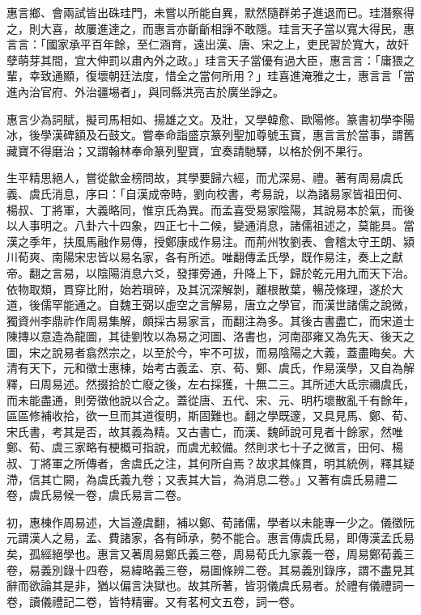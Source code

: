 \begin{pinyinscope}
惠言鄉、會兩試皆出硃珪門，未嘗以所能自異，默然隨群弟子進退而已。珪潛察得之，則大喜，故屢進達之，而惠言亦齗齗相諍不敢隱。珪言天子當以寬大得民，惠言言：「國家承平百年餘，至仁涵育，遠出漢、唐、宋之上，吏民習於寬大，故奸孽萌芽其間，宜大伸罰以肅內外之政。」珪言天子當優有過大臣，惠言言：「庸猥之輩，幸致通顯，復壞朝廷法度，惜全之當何所用？」珪喜進淹雅之士，惠言言「當進內治官府、外治疆埸者」，與同縣洪亮吉於廣坐諍之。

惠言少為詞賦，擬司馬相如、揚雄之文。及壯，又學韓愈、歐陽修。篆書初學李陽冰，後學漢碑額及石鼓文。嘗奉命詣盛京篆列聖加尊號玉寶，惠言言於當事，謂舊藏寶不得磨治；又謂翰林奉命篆列聖寶，宜奏請馳驛，以格於例不果行。

生平精思絕人，嘗從歙金榜問故，其學要歸六經，而尤深易、禮。著有周易虞氏義、虞氏消息，序曰：「自漢成帝時，劉向校書，考易說，以為諸易家皆祖田何、楊叔、丁將軍，大義略同，惟京氏為異。而孟喜受易家陰陽，其說易本於氣，而後以人事明之。八卦六十四象，四正七十二候，變通消息，諸儒祖述之，莫能具。當漢之季年，扶風馬融作易傳，授鄭康成作易注。而荊州牧劉表、會稽太守王朗、潁川荀爽、南陽宋忠皆以易名家，各有所述。唯翻傳孟氏學，既作易注，奏上之獻帝。翻之言易，以陰陽消息六爻，發揮旁通，升降上下，歸於乾元用九而天下治。依物取類，貫穿比附，始若瑣碎，及其沉深解剝，離根散葉，暢茂條理，遂於大道，後儒罕能通之。自魏王弼以虛空之言解易，唐立之學官，而漢世諸儒之說微，獨資州李鼎祚作周易集解，頗採古易家言，而翻注為多。其後古書盡亡，而宋道士陳摶以意造為龍圖，其徒劉牧以為易之河圖、洛書也，河南邵雍又為先天、後天之圖，宋之說易者翕然宗之，以至於今，牢不可拔，而易陰陽之大義，蓋盡晦矣。大清有天下，元和徵士惠棟，始考古義孟、京、荀、鄭、虞氏，作易漢學，又自為解釋，曰周易述。然掇拾於亡廢之後，左右採獲，十無二三。其所述大氐宗禰虞氏，而未能盡通，則旁徵他說以合之。蓋從唐、五代、宋、元、明朽壞散亂千有餘年，區區修補收拾，欲一旦而其道復明，斯固難也。翻之學既邃，又具見馬、鄭、荀、宋氏書，考其是否，故其義為精。又古書亡，而漢、魏師說可見者十餘家，然唯鄭、荀、虞三家略有梗概可指說，而虞尤較備。然則求七十子之微言，田何、楊叔、丁將軍之所傳者，舍虞氏之注，其何所自焉？故求其條貫，明其統例，釋其疑滯，信其亡闕，為虞氏義九卷；又表其大旨，為消息二卷。」又著有虞氏易禮二卷，虞氏易候一卷，虞氏易言二卷。

初，惠棟作周易述，大旨遵虞翻，補以鄭、荀諸儒，學者以未能專一少之。儀徵阮元謂漢人之易，孟、費諸家，各有師承，勢不能合。惠言傳虞氏易，即傳漢孟氏易矣，孤經絕學也。惠言又著周易鄭氏義三卷，周易荀氏九家義一卷，周易鄭荀義三卷，易義別錄十四卷，易緯略義三卷，易圖條辨二卷。其易義別錄序，謂不盡見其辭而欲論其是非，猶以偏言決獄也。故其所著，皆羽儀虞氏易者。於禮有儀禮詞一卷，讀儀禮記二卷，皆特精審。又有茗柯文五卷，詞一卷。


\end{pinyinscope}
